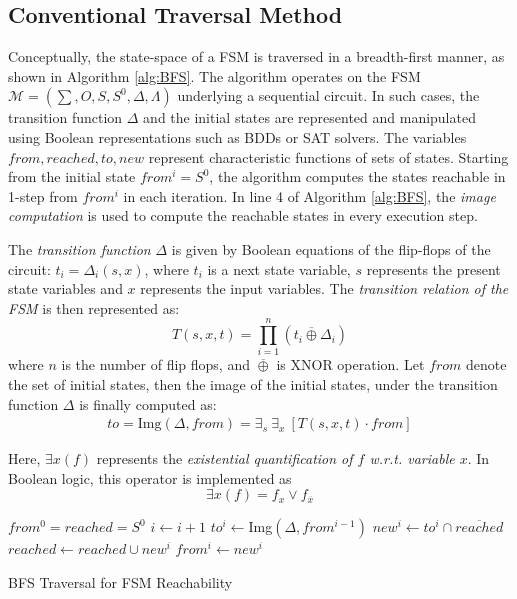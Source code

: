 \subsection{Conventional Traversal Method}
Conceptually, the state-space of a FSM is traversed in a breadth-first
manner, as shown in Algorithm \ref{alg:BFS}. %
The algorithm operates on the FSM $\mathcal{M} = (\sum, O, S, S^0,
\Delta, \Lambda)$ underlying a sequential circuit. In such cases, the
transition function $\Delta$ and the initial states are represented
and manipulated using Boolean representations such as BDDs or SAT
solvers. The variables $from, reached, to, new$ represent
characteristic functions of sets of states. Starting from the initial
state $from^i = S^0$, the algorithm computes the states reachable in
1-step from $from^i$ in each iteration. In line 4 of Algorithm
\ref{alg:BFS}, the {\it image computation} is 
used to compute the reachable states in every execution step. 

The {\it transition function} $\Delta$ is given by Boolean equations
  of the flip-flops of the circuit: $t_i = \Delta_i(s, x)$, where
  $t_i$ is a next state variable, $s$ represents the present   state
  variables and $x$ represents the input variables. The {\it
    transition relation of the FSM} is then represented as:  
\begin{equation} 
T(s, x, t) =   \prod_{i=1}^{n} (t_i \overline{\oplus } \Delta_i)
\end{equation}
where $n$ is the number of flip flops, and $\overline{\oplus}$ is XNOR
operation. Let $from$ denote the set of initial states, then the
image of the initial states, under the transition function $\Delta$ is
finally computed as:
\begin{align}
\label{eqn:img}
to = \text{Img}(\Delta, from) = \exists _s ~\exists _x ~[ T(s, x, t)
  \cdot from ] 
\end{align}

Here, $\exists x (f)$ represents the {\it existential quantification
  of $f$ w.r.t. variable $x$}. In Boolean logic, this operator is implemented as
  $$\exists x (f) = f_x\lor f_{\overline{x}}$$


\IncMargin{1em}
\begin{algorithm}[hbt]
\SetAlgoNoLine
\Indm
\Indp

  $from^0 = reached = S^0$\;
  {
  	$i \gets i + 1$\;
	$to^i \gets$Img$(\Delta, from^{i-1})$\;
	$new^i \gets to^i \cap \overline{reached}$\;
  	$reached \gets reached \cup new^i$\;
	$from^i \gets new^i$\;
  }
\caption {BFS Traversal for FSM Reachability}\label{alg:BFS}
\end{algorithm}
\DecMargin{1em}


